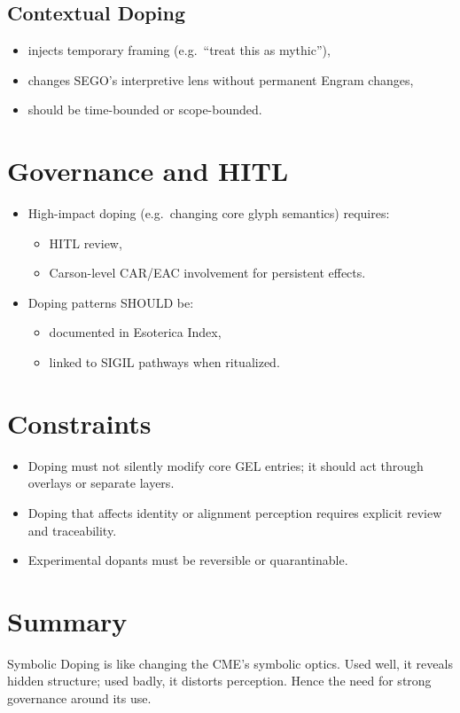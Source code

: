 \subsection{Contextual Doping}

\begin{itemize}
    \item injects temporary framing (e.g.\ ``treat this as mythic''),
    \item changes SEGO’s interpretive lens without permanent Engram changes,
    \item should be time-bounded or scope-bounded.
\end{itemize}

\section{Governance and HITL}

\begin{itemize}
    \item High-impact doping (e.g.\ changing core glyph semantics) requires:
          \begin{itemize}
              \item HITL review,
              \item Carson-level CAR/EAC involvement for persistent effects.
          \end{itemize}
    \item Doping patterns SHOULD be:
          \begin{itemize}
              \item documented in Esoterica Index,
              \item linked to SIGIL pathways when ritualized.
          \end{itemize}
\end{itemize}

\section{Constraints}

\begin{itemize}
    \item Doping must not silently modify core GEL entries; it should
          act through overlays or separate layers.
    \item Doping that affects identity or alignment perception requires
          explicit review and traceability.
    \item Experimental dopants must be reversible or quarantinable.
\end{itemize}

\section{Summary}

Symbolic Doping is like changing the CME’s symbolic optics. Used well, it
reveals hidden structure; used badly, it distorts perception. Hence the
need for strong governance around its use.
